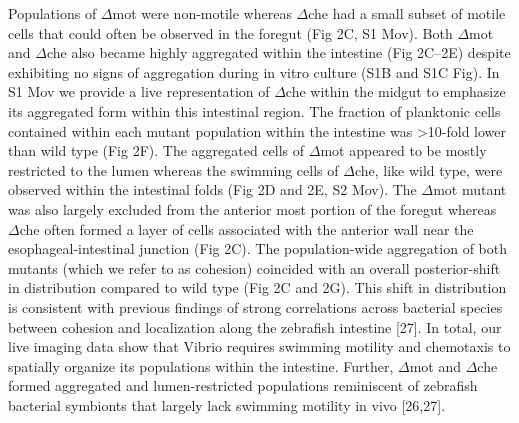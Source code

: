 Populations of $\Delta$mot were non-motile whereas $\Delta$che had a small subset of motile cells that could often be observed in the foregut (Fig 2C, S1 Mov). Both $\Delta$mot and $\Delta$che also became highly aggregated within the intestine (Fig 2C–2E) despite exhibiting no signs of aggregation during in vitro culture (S1B and S1C Fig). In S1 Mov we provide a live representation of $\Delta$che within the midgut to emphasize its aggregated form within this intestinal region. The fraction of planktonic cells contained within each mutant population within the intestine was >10-fold lower than wild type (Fig 2F). The aggregated cells of $\Delta$mot appeared to be mostly restricted to the lumen whereas the swimming cells of $\Delta$che, like wild type, were observed within the intestinal folds (Fig 2D and 2E, S2 Mov). The $\Delta$mot mutant was also largely excluded from the anterior most portion of the foregut whereas $\Delta$che often formed a layer of cells associated with the anterior wall near the esophageal-intestinal junction (Fig 2C). The population-wide aggregation of both mutants (which we refer to as cohesion) coincided with an overall posterior-shift in distribution compared to wild type (Fig 2C and 2G). This shift in distribution is consistent with previous findings of strong correlations across bacterial species between cohesion and localization along the zebrafish intestine [27]. In total, our live imaging data show that Vibrio requires swimming motility and chemotaxis to spatially organize its populations within the intestine. Further, $\Delta$mot and $\Delta$che formed aggregated and lumen-restricted populations reminiscent of zebrafish bacterial symbionts that largely lack swimming motility in vivo [26,27]. 


